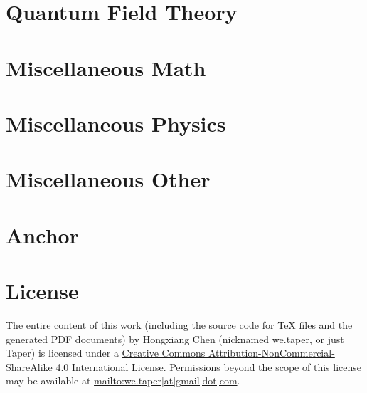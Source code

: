 \documentclass{article}
\begin{document}
    

\section{Quantum Field Theory}
\label{sec:Quantum_Field_Theory}


\section{Miscellaneous Math}
\label{sec:Miscellnaneous_Math}


\section{Miscellaneous Physics}
\label{sec:Miscellnaneous_Physics}


\section{Miscellaneous Other}
\label{sec:Miscellaneous_Other}


\section{Anchor}



\section{License}
The entire content of this work (including the source code
for TeX files and the generated PDF documents) by 
Hongxiang Chen (nicknamed we.taper, or just Taper) is
licensed under a 
\href{http://creativecommons.org/licenses/by-nc-sa/4.0/}{Creative 
Commons Attribution-NonCommercial-ShareAlike 4.0 International 
License}. Permissions beyond the scope of this 
license may be available at \url{mailto:we.taper[at]gmail[dot]com}.
\end{document}
